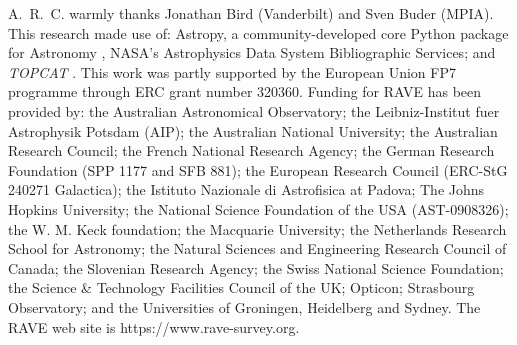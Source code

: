 \documentclass[preprint,trackchanges]{aastex}
\newcommand{\project}[1]{\textsl{#1}}
\begin{document}
\acknowledgements
A.~R.~C. warmly thanks Jonathan Bird (Vanderbilt) and Sven Buder (MPIA).
This research made use of: Astropy, a community-developed core Python package for
Astronomy \citep{astropy}, NASA's Astrophysics Data System Bibliographic Services;
and \project{TOPCAT} \citep{Taylor_2005}.
This work was partly supported by the European Union FP7 programme through ERC 
grant number 320360.
Funding for RAVE has been provided by: the Australian Astronomical Observatory; 
the Leibniz-Institut fuer Astrophysik Potsdam (AIP); the Australian National 
University; the Australian Research Council; the French National Research Agency;
the German Research Foundation (SPP 1177 and SFB 881); the European Research 
Council (ERC-StG 240271 Galactica); the Istituto Nazionale di Astrofisica at 
Padova; The Johns Hopkins University; the National Science Foundation of the USA
(AST-0908326); the W. M. Keck foundation; the Macquarie University; the 
Netherlands Research School for Astronomy; the Natural Sciences and Engineering 
Research Council of Canada; the Slovenian Research Agency; the Swiss National 
Science Foundation; the Science \& Technology Facilities Council of the UK; 
Opticon; Strasbourg Observatory; and the Universities of Groningen, Heidelberg 
and Sydney. The RAVE web site is https://www.rave-survey.org.  
\end{document}
